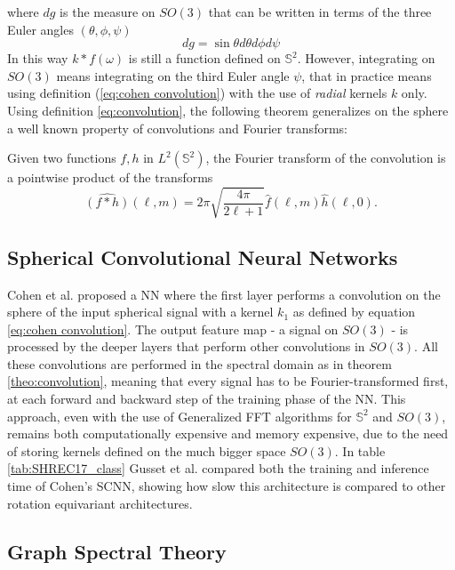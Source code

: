 where $dg$ is the measure on $SO(3)$ that can be written in terms of the three Euler angles $(\theta, \phi, \psi)$ 
$$dg=\sin\theta d\theta d\phi d\psi$$
In this way $k * f(\omega)$ is still a function defined on $\mathbb S^2$. However, integrating on $SO(3)$ means integrating on the third Euler angle $\psi$, that in practice means using definition (\ref{eq:cohen convolution}) with the use of \textit{radial} kernels $k$ only.
Using definition \ref{eq:convolution}, the following theorem \cite{Driscoll:1994:CFT:184069.184073} generalizes on the sphere a well known property of convolutions and Fourier transforms: 
\vspace{0.5cm}
\begin{theorem}\label{theo:convolution}
	Given two functions $f, h$ in $L^2(\mathbb S^2)$, the Fourier transform of the convolution is a pointwise product of the transforms
$$
\hat{(f * h)}(\ell, m)=2 \pi \sqrt{\frac{4 \pi}{2 \ell+1}} \hat{f}(\ell, m) \hat{h}(\ell, 0).
$$
\end{theorem}
\vspace{0.5cm}

\subsection{Spherical Convolutional Neural Networks}\label{sec:Chapter1:SCNN}
Cohen et al. \cite{SCNN} proposed a NN where the first layer performs a convolution on the sphere of the input spherical signal with a kernel $k_1$ as defined by equation \ref{eq:cohen convolution}. The output feature map - a signal on $SO(3)$ - is processed by the deeper layers that perform other convolutions in $SO(3)$. All these convolutions are performed in the spectral domain as in theorem \ref{theo:convolution}, meaning that every signal has to be Fourier-transformed first, at each forward and backward step of the training phase of the NN. This approach, even with the use of Generalized FFT algorithms for $\mathbb S^2$ and $SO(3)$, remains both computationally expensive and memory expensive, due to the need of storing kernels defined on the much bigger space $SO(3)$. In table \ref{tab:SHREC17_class} Gusset et al. \cite{Gusset} compared both the training and inference time of Cohen's SCNN, showing how slow this architecture is compared to other rotation equivariant architectures.
\subsection{Graph Spectral Theory} \label{sec:Chapter1: Spectral Graph Theory}
